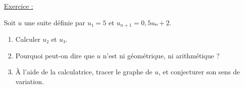 \documentclass{automatisme}
\begin{document}
\begin{frame}
	\vspace{1em}

	{\Large \uline{Exercice :}}

	Soit $u$ une suite définie par $u₁ = 5$ et $u_{n+1} = 0,5uₙ + 2$.

	\begin{enumerate}
		\item Calculer $u₂$ et $u₃$.
		\item Pourquoi peut-on dire que $u$ n'est ni géométrique, ni arithmétique ?
		\item À l'aide de la calculatrice, tracer le graphe de $u$, et conjecturer son sens de variation.
	\end{enumerate}
\end{frame}
\end{document}
